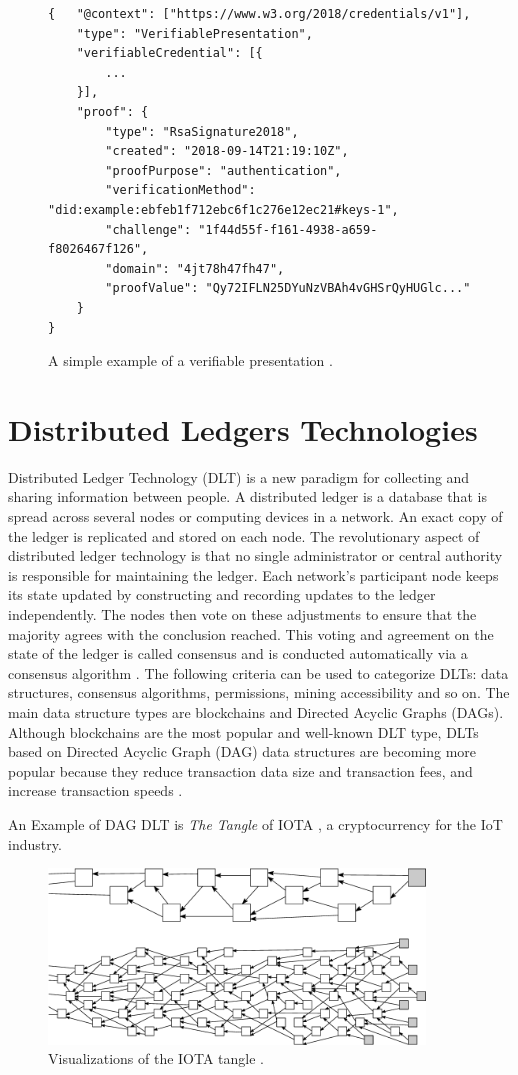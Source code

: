 \begin{figure}[h!]
\begin{lstlisting}[style=json, breaklines=true,frame=single]
{   "@context": ["https://www.w3.org/2018/credentials/v1"],
    "type": "VerifiablePresentation",
    "verifiableCredential": [{
        ...
    }],
    "proof": {
        "type": "RsaSignature2018",
        "created": "2018-09-14T21:19:10Z",
        "proofPurpose": "authentication",
        "verificationMethod": "did:example:ebfeb1f712ebc6f1c276e12ec21#keys-1",
        "challenge": "1f44d55f-f161-4938-a659-f8026467f126",
        "domain": "4jt78h47fh47",
        "proofValue": "Qy72IFLN25DYuNzVBAh4vGHSrQyHUGlc..."
    }
}   
\end{lstlisting}
\caption{A simple example of a verifiable presentation \cite{vcW3C}. \label{vpExample}}
\end{figure}
\section{Distributed Ledgers Technologies}

Distributed Ledger Technology (DLT)  is a new paradigm for collecting and sharing information between people. A distributed ledger is a database that is spread across several nodes or computing devices in a network. An exact copy of the ledger is replicated and stored on each node. The revolutionary aspect of distributed ledger technology is that no single administrator or central authority is responsible for maintaining the ledger. Each network's participant node keeps its state updated by constructing and recording updates to the ledger independently. The nodes then vote on these adjustments to ensure that the majority agrees with the conclusion reached. This voting and agreement on the state of the ledger is called consensus and is conducted automatically via a consensus algorithm \cite{dlt-intro-1}. 
The following criteria can be used to categorize DLTs: data structures, consensus algorithms, permissions, mining accessibility and so on. The main data structure types are blockchains and Directed Acyclic Graphs (DAGs). Although blockchains are the most popular and well-known DLT type,  DLTs based on Directed Acyclic Graph (DAG) data structures are becoming more popular because they reduce transaction data size and transaction fees, and increase transaction speeds \cite{dlt-intro-2}.

An Example of DAG DLT is \textit{The Tangle} of IOTA \cite{popov2018tangle}, a cryptocurrency for the IoT industry.

\begin{figure}[h!]
    \centering 
    \includegraphics[width=10cm]{./chapters/images/tangle.png}
    \caption{Visualizations of the IOTA tangle \cite{popov2018tangle}.}
    \label{tangleFigure}
\end{figure}

